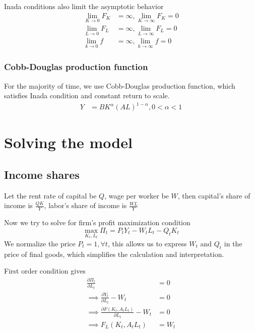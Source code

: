 \documentclass[twocolumn, fleqn]{article}
\begin{document}
				Inada conditions also limit the asymptotic behavior
				\begin{align*}
					\lim_{K \rightarrow 0} F_K &= \infty, \lim_{K \rightarrow \infty} F_K= 0\\
					\lim_{L \rightarrow 0} F_L &= \infty, \lim_{L \rightarrow \infty} F_L = 0\\
					\lim_{k \rightarrow 0} f &= \infty, \lim_{k \rightarrow \infty} f= 0
				\end{align*}

			\subsubsection{Cobb-Douglas production function}
				For the majority of time, we use Cobb-Douglas production function, which satisfies Inada condition
				and constant return to scale.
				\begin{align*}
					Y &= B K^{\alpha}(AL)^{1-\alpha}, 0<\alpha<1
				\end{align*}

	\section{Solving the model}
		\subsection{Income shares}
			Let the rent rate of capital be $Q$, wage per worker be $W$, then capital's share of income is $\frac{QK}{Y}$, labor's share of income is $\frac{WL}{Y}$

			Now we try to solve for firm's profit maximization condition
			\begin{equation*}
				\max_{K_t,L_t} \Pi_t = P_t Y_t - W_t L_t - Q_t K_t
			\end{equation*}
			We normalize the price $P_t = 1, \forall t$, this allows us to express $W_t$ and $Q_t$ in the price
			of final goods, which simplifies the calculation and interpretation.

			First order condition gives
			\begin{align*}
				\frac{\partial \Pi_t}{\partial L_t} &= 0\\
				\implies \frac{\partial Y_t}{\partial L_t}-W_t&=0\\
				\implies \frac{\partial F(K_t,A_t L_t)}{\partial L_t}-W_t&=0\\
				\implies F_L(K_t,A_t L_t) &=W_t
			\end{align*}
\end{document}
